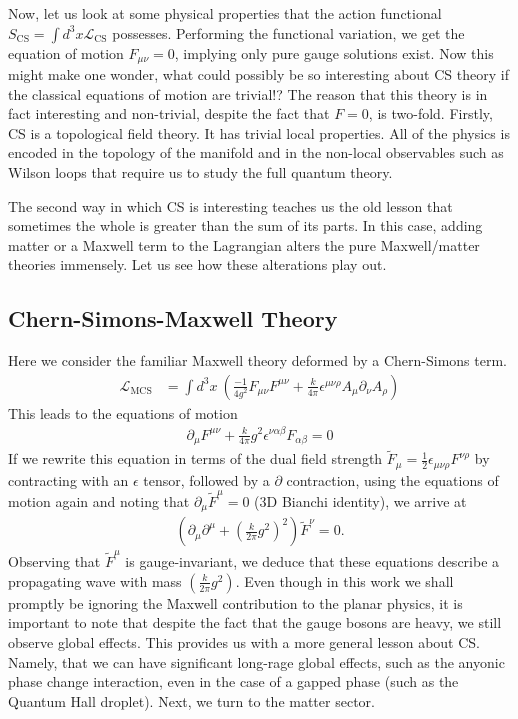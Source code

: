     Now, let us look at some physical properties that the action functional $S_{\text{CS}} = \int d^3x \mathcal{L}_{\text{CS}}$ possesses. Performing the functional variation, we get the equation of motion $F_{\mu \nu}=0$, implying only pure gauge solutions exist. Now this might make one wonder, what could possibly be so interesting about CS theory if the classical equations of motion are trivial!?
    The reason that this theory is in fact interesting and non-trivial, despite the fact that $F=0$, is two-fold. Firstly, CS is a topological field theory. It has trivial local properties. All of the physics is encoded in the topology of the manifold and in the non-local observables such as Wilson loops that require us to study the full quantum theory.

    The second way in which CS is interesting teaches us the old lesson that sometimes the whole is greater than the sum of its parts. In this case, adding matter or a Maxwell term to the Lagrangian alters the pure Maxwell/matter theories immensely. Let us see how these alterations play out.

    \subsection{Chern-Simons-Maxwell Theory}
    Here we consider the familiar Maxwell theory deformed by a Chern-Simons term.
    \begin{align}
        \mathcal{L}_{\text{MCS}} &= \int d^3x \ \left( \frac{-1}{4 g^2} F_{\mu \nu} F^{\mu \nu} + \frac{k}{4 \pi} \epsilon^{\mu \nu \rho} A_{\mu} \partial_{\nu} A_{\rho} \right)
    \end{align}
    This leads to the equations of motion
    \begin{align}
        \partial_{\mu} F^{\mu \nu} + \frac{k}{4\pi} g^2 \epsilon^{\nu \alpha \beta}F_{\alpha \beta} =0
    \end{align}
    If we rewrite this equation in terms of the dual field strength $\tilde{F}_{\mu} = \frac{1}{2} \epsilon_{\mu\nu\rho} F^{\nu\rho}$ by contracting with an $\epsilon$ tensor, followed by a $\partial$ contraction, using the equations of motion again and noting that $\partial_{\mu} \tilde{F}^{\mu} =0$ (3D Bianchi identity), we arrive at 
    \begin{align}
        \left(\partial_{\mu} \partial^{\mu} + \left(\frac{k}{2 \pi} g^2 \right)^2 \right) \tilde{F}^{\nu}=0.
    \end{align}
    Observing that $\tilde{F}^{\mu}$ is gauge-invariant, we deduce that these equations describe a propagating wave with mass $\left(\frac{k}{2 \pi} g^2 \right)$.
    Even though in this work we shall promptly be ignoring the Maxwell contribution to the planar physics, it is important to note that despite the fact that the gauge bosons are heavy, we still observe global effects. This provides us with a more general lesson about CS. Namely, that we can have significant long-rage global effects, such as the anyonic phase change interaction, even in the case of a gapped phase (such as the Quantum Hall droplet).
    Next, we turn to the matter sector.
